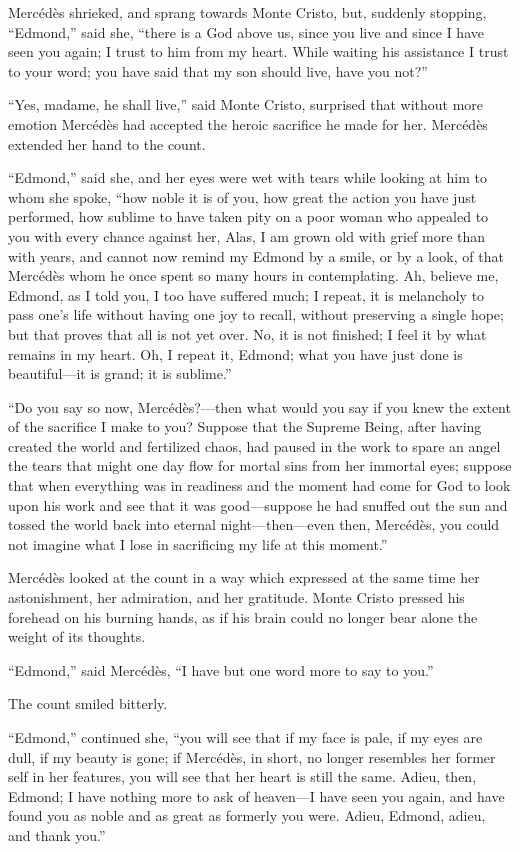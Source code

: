 Mercédès shrieked, and sprang towards Monte Cristo, but, suddenly
stopping, “Edmond,” said she, “there is a God above us, since you live
and since I have seen you again; I trust to him from my heart. While
waiting his assistance I trust to your word; you have said that my son
should live, have you not?”

“Yes, madame, he shall live,” said Monte Cristo, surprised that without
more emotion Mercédès had accepted the heroic sacrifice he made for
her. Mercédès extended her hand to the count.

“Edmond,” said she, and her eyes were wet with tears while looking at
him to whom she spoke, “how noble it is of you, how great the action
you have just performed, how sublime to have taken pity on a poor woman
who appealed to you with every chance against her, Alas, I am grown old
with grief more than with years, and cannot now remind my Edmond by a
smile, or by a look, of that Mercédès whom he once spent so many hours
in contemplating. Ah, believe me, Edmond, as I told you, I too have
suffered much; I repeat, it is melancholy to pass one’s life without
having one joy to recall, without preserving a single hope; but that
proves that all is not yet over. No, it is not finished; I feel it by
what remains in my heart. Oh, I repeat it, Edmond; what you have just
done is beautiful—it is grand; it is sublime.”

“Do you say so now, Mercédès?—then what would you say if you knew the
extent of the sacrifice I make to you? Suppose that the Supreme Being,
after having created the world and fertilized chaos, had paused in the
work to spare an angel the tears that might one day flow for mortal
sins from her immortal eyes; suppose that when everything was in
readiness and the moment had come for God to look upon his work and see
that it was good—suppose he had snuffed out the sun and tossed the
world back into eternal night—then—even then, Mercédès, you could not
imagine what I lose in sacrificing my life at this moment.”

Mercédès looked at the count in a way which expressed at the same time
her astonishment, her admiration, and her gratitude. Monte Cristo
pressed his forehead on his burning hands, as if his brain could no
longer bear alone the weight of its thoughts.

“Edmond,” said Mercédès, “I have but one word more to say to you.”

The count smiled bitterly.

“Edmond,” continued she, “you will see that if my face is pale, if my
eyes are dull, if my beauty is gone; if Mercédès, in short, no longer
resembles her former self in her features, you will see that her heart
is still the same. Adieu, then, Edmond; I have nothing more to ask of
heaven—I have seen you again, and have found you as noble and as great
as formerly you were. Adieu, Edmond, adieu, and thank you.”

